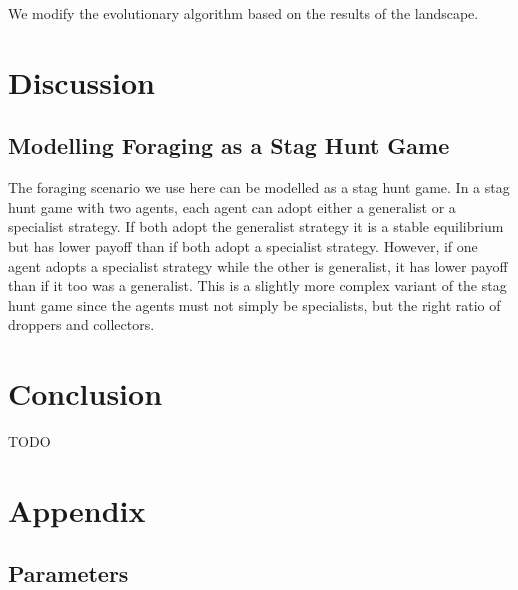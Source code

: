 \documentclass[12pt]{article}  %
\begin{document}
We modify the evolutionary algorithm based on the results of the landscape.

\section{Discussion}

\subsection{Modelling Foraging as a Stag Hunt Game}

The foraging scenario we use here can be modelled as a stag hunt game.
In a stag hunt game with two agents, each agent can adopt either a generalist or a specialist strategy. 
If both adopt the generalist strategy it is a stable equilibrium but has lower payoff than if both adopt a specialist strategy.
However, if one agent adopts a specialist strategy while the other is generalist, it has lower payoff than if it too was a generalist.
This is a slightly more complex variant of the stag hunt game since the agents must not simply be specialists, but the right ratio of droppers and collectors. 

\section{Conclusion}

TODO




\section{Appendix}

\subsection{Parameters}
\end{document}
